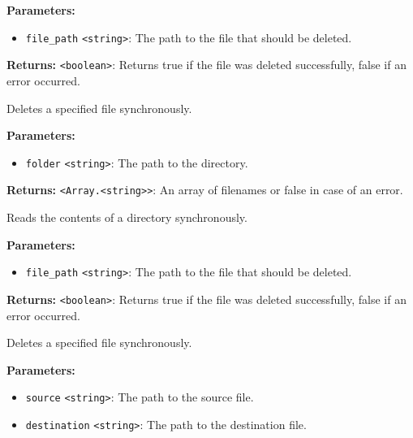\documentclass[12pt,a4paper]{article}
\begin{document}
\noindent \textbf{Parameters:}
\begin{itemize}
  \item \texttt{file\_path} \texttt{<string>}: The path to the file that should be deleted.
\end{itemize}

\noindent \textbf{Returns:} \texttt{<boolean>}: Returns true if the file was deleted successfully, false if an error occurred.

\noindent Deletes a specified file synchronously.

\vspace{5mm}
\noindent {}


\noindent \textbf{Parameters:}
\begin{itemize}
  \item \texttt{folder} \texttt{<string>}: The path to the directory.
\end{itemize}

\noindent \textbf{Returns:} \texttt{<Array.<string>>}: An array of filenames or false in case of an error.

\noindent Reads the contents of a directory synchronously.

\vspace{5mm}
\noindent {}


\noindent \textbf{Parameters:}
\begin{itemize}
  \item \texttt{file\_path} \texttt{<string>}: The path to the file that should be deleted.
\end{itemize}

\noindent \textbf{Returns:} \texttt{<boolean>}: Returns true if the file was deleted successfully, false if an error occurred.

\noindent Deletes a specified file synchronously.

\vspace{5mm}
\noindent {}


\noindent \textbf{Parameters:}
\begin{itemize}
  \item \texttt{source} \texttt{<string>}: The path to the source file.
  \item \texttt{destination} \texttt{<string>}: The path to the destination file.
\end{itemize}
\end{document}
